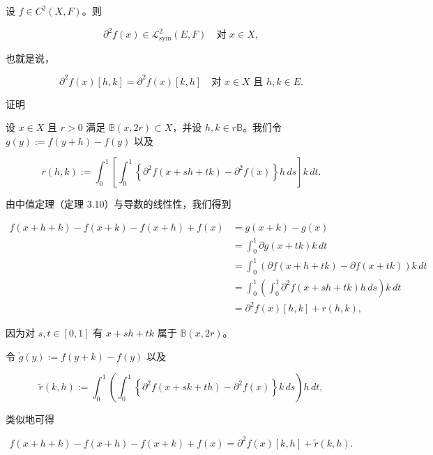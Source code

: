 \begin{theorem}

设 $ f \in C^{2}(X, F) $。则

\[
\partial^{2}f(x) \in \mathcal{L}^{2}_{\mathrm{sym}}(E, F) \quad \text{对 } x \in X ,
\]

也就是说，

\[
\partial^{2}f(x)[h, k] = \partial^{2}f(x)[k, h] \quad \text{对 } x \in X \text{ 且 } h, k \in E .
\]

证明

\begin{subitems}
\item

设 $ x \in X $ 且 $ r > 0 $ 满足 $ \mathbb{B}(x, 2r) \subset X $，并设 $ h, k \in r\mathbb{B} $。我们令 $ g(y) := f(y + h) - f(y) $ 以及

\[
r(h, k) := \int_{0}^{1}\left[ \int_{0}^{1}\left\{ \partial^{2}f(x + sh + tk) - \partial^{2}f(x) \right\}h\, ds \right]k\, dt .
\]

由中值定理（定理 3.10）与导数的线性性，我们得到

\begin{equation*}
\begin{aligned}
f(x + h + k) - f(x + k) - f(x + h) + f(x) &= g(x + k) - g(x) \\ &= \int_{0}^{1}\partial g(x + tk)k\, dt \\ &= \int_{0}^{1}\left( \partial f(x + h + tk) - \partial f(x + tk) \right)k\, dt \\ &= \int_{0}^{1}\left( \int_{0}^{1}\partial^{2}f(x + sh + tk)h\, ds \right)k\, dt \\ &= \partial^{2}f(x)[h, k] + r(h, k) ,
\end{aligned}
\end{equation*}

因为对 $ s, t \in [0, 1] $ 有 $ x + sh + tk $ 属于 $ \mathbb{B}(x, 2r) $。

\item

令 $ \tilde{g}(y) := f(y + k) - f(y) $ 以及

\[
\tilde{r}(k, h) := \int_{0}^{1}\left( \int_{0}^{1}\left\{ \partial^{2}f(x + sk + th) - \partial^{2}f(x) \right\}k\, ds \right)h\, dt ,
\]

类似地可得

\[
f(x + h + k) - f(x + h) - f(x + k) + f(x) = \partial^{2}f(x)[k, h] + \tilde{r}(k, h) .
\]


\end{subitems}
\end{theorem}
